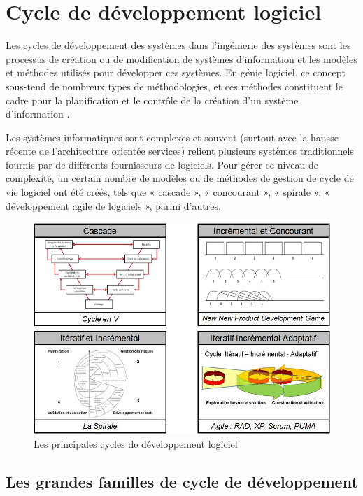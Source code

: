 \section{Cycle de développement logiciel}

Les cycles de développement des systèmes dans l'ingénierie des systèmes sont les processus de création ou de modification de systèmes d'information et les modèles et méthodes utilisés pour développer ces systèmes. En génie logiciel, ce concept sous-tend de nombreux types de méthodologies, et ces méthodes constituent le cadre pour la planification et le contrôle de la création d'un système d'information \cite{cycle}.

Les systèmes informatiques sont complexes et souvent (surtout avec la hausse récente de l'architecture orientée services) relient plusieurs systèmes traditionnels fournis par de différents fournisseurs de logiciels. Pour gérer ce niveau de complexité, un certain nombre de modèles ou de méthodes de gestion de cycle de vie logiciel ont été créés, tels que « cascade », « concourant », « spirale », « développement agile de logiciels », parmi d'autres.

\begin{figure}[H]
\begin{center}
    \includegraphics[scale=0.4]{img/cycles-basiques}
    \caption{Les principales cycles de développement logiciel}
	\label{cycles-basiques}
\end{center}
\end{figure}

\subsection{Les grandes familles de cycle de développement}

